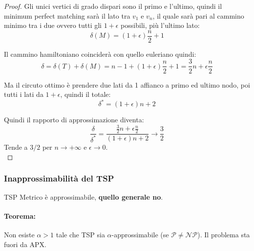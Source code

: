 \documentclass[11pt]{article}
\begin{document}
\begin{proof}
		Gli unici vertici di grado dispari sono il primo e l'ultimo, quindi il minimum perfect matching sarà il lato tra $v_1$ e $v_n$, il quale sarà pari al cammino minimo tra i due ovvero tutti gli $1 + \epsilon$ possibili, più l'ultimo lato:
		$$ \delta(M) = (1 + \epsilon) \frac{n}{2} + 1$$
		
		Il cammino hamiltoniano coinciderà con quello euleriano quindi:
		$$ \delta = \delta (T) + \delta (M) = n-1 + (1 + \epsilon) \frac{n}{2} + 1 = \frac{3}{2} n + \epsilon \frac{n}{2} $$
		
		Ma il circuto ottimo è prendere due lati da 1 affianco a primo ed ultimo nodo, poi tutti i lati da $1 + \epsilon$, quindi il totale: 
		$$ \delta^\ast = (1+ \epsilon)n + 2 $$
		
		Quindi il rapporto di approssimazione diventa: 
		$$ \frac{\delta}{\delta^\ast} = \frac{\frac{3}{2}n + \epsilon \frac{n}{2}}{ (1 + \epsilon) n + 2} \rightarrow \frac{3}{2}$$
		Tende a $3/2$ per $n \rightarrow +\infty$ e $\epsilon \rightarrow 0$.\\
	\end{proof}
	
	\newpage
	
	
	\subsubsection{Inapprossimabilità del TSP}
	
	TSP Metrico è approssimabile, \textbf{quello generale no}.\\
	
	\paragraph{Teorema:} Non esiste $\alpha>1$ tale che TSP sia $\alpha$-approssimabile (se $\mathcal{P} \neq \mathcal{NP}$). Il problema sta fuori da APX.\\
	
\end{document}
